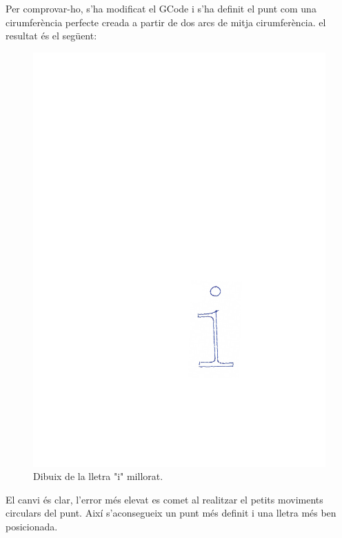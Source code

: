 \begin{itemize}
	Per comprovar-ho, s'ha modificat el GCode i s'ha definit el punt com una cirumferència perfecte creada a partir de dos arcs de mitja cirumferència. el resultat és el següent:
	\begin{figure}[H]
		\centering
		\includegraphics{resultatLletra2}
		\caption{Dibuix de la lletra "i" millorat.}
		\label{fig:Lletra2}
	\end{figure}
	El canvi és clar, l'error més elevat es comet al realitzar el petits moviments circulars del punt. Així s'aconsegueix un punt més definit i una lletra més ben posicionada.
	
	
	
	
\end{itemize}


